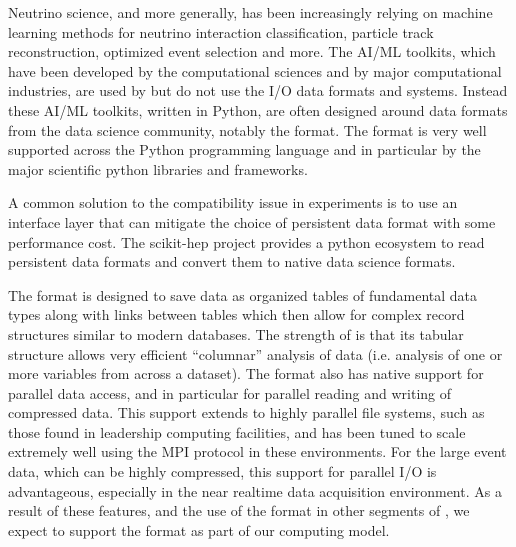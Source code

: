 \documentclass[../main-v1.tex]{subfiles}
\begin{document}
Neutrino science, and  more generally, has been increasingly relying on machine learning methods for neutrino interaction classification, particle track reconstruction, optimized event selection and more.  The AI/ML toolkits, which have been developed by the computational sciences and by major computational industries, are used by  but do not use 
the  I/O data formats and systems.
Instead these AI/ML toolkits, written in Python, are often designed around 
data formats from the data science community,
notably the  format.  The  format is very well supported across the Python programming language and in particular by the major scientific python libraries and frameworks.  

A common solution to the compatibility issue in  experiments is to use an interface layer that can mitigate the choice of persistent data format with some performance cost.  The scikit-hep project\cite{Rodrigues:2019nct} provides a python ecosystem to read  persistent data formats and convert them to native data science formats.

The  format is designed to save data as organized tables of fundamental data types along with links between tables which then allow for complex record structures similar to modern databases.  The strength of  is that its tabular structure allows very
efficient ``columnar'' analysis of data (i.e. analysis of one or more variables from across a dataset).
The format also has native support for parallel data access, and in particular for parallel reading and writing of compressed data.  This support extends to highly parallel file systems, such as those found in leadership computing facilities, and has been tuned to scale extremely well using the MPI protocol in these environments.  
For the large  event data, which can be highly compressed, this support for parallel I/O is advantageous, especially in the near realtime data acquisition environment.  As a result of these features, and the use of the format in other segments of , we expect to support the  format as part of our computing model.
\end{document}
